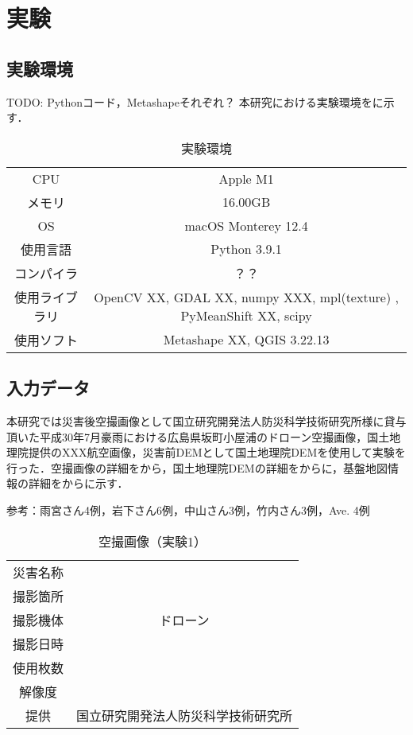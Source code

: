 \chapter{実験}
  \section{実験環境}
  TODO: Pythonコード，Metashapeそれぞれ？
    本研究における実験環境をに示す．

    \begin{table}[b]
      \centering
      \caption{実験環境}
      \label{実験環境}
      \begin{tabular}{cc}
        \hline
        CPU & Apple M1 \\
        メモリ & 16.00GB \\
        OS & macOS Monterey 12.4 \\
        使用言語 & Python 3.9.1 \\
        コンパイラ & ？？ \\
        使用ライブラリ & OpenCV XX, GDAL XX, numpy XXX, mpl(texture) , PyMeanShift XX, scipy \\ 
        使用ソフト & Metashape XX, QGIS 3.22.13 \\ \hline 
      \end{tabular}
    \end{table}


  \section{入力データ}
    本研究では災害後空撮画像として国立研究開発法人防災科学技術研究所様に貸与頂いた平成30年7月豪雨における広島県坂町小屋浦のドローン空撮画像\cite{}，国土地理院提供のXXX航空画像，災害前DEMとして国土地理院DEMを使用して実験を行った．空撮画像の詳細をから，国土地理院DEMの詳細をからに，基盤地図情報の詳細をからに示す．

    参考：雨宮さん4例，岩下さん6例，中山さん3例，竹内さん3例，Ave. 4例

    \begin{table}[b]
      \centering
      \caption{空撮画像（実験1）}
      \label{空撮画像1}
      \begin{tabular}{cc}
        \hline
        災害名称 &  \\
        撮影箇所 &  \\
        撮影機体 & ドローン \\
        撮影日時 &  \\
        使用枚数 & \\
        解像度 &  \\
        提供 & 国立研究開発法人防災科学技術研究所 \\ \hline
      \end{tabular}
    \end{table}

